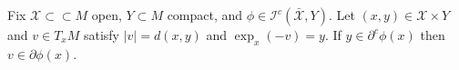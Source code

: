 \begin{lem}
	\label{lem:c-super-gradients_imply_super-gradients}
	Fix \( \mathcal { X } \subset \subset M \) open,
	\( Y \subset M \) compact, and \( \phi \in \mathcal { I } ^ { c } ( \bar { \mathcal{X} } , Y ) \).
	Let \( ( x , y ) \in \mathcal { X } \times Y \) and \( v \in T _ { x } M \) satisfy
	\( | v | = d ( x , y ) \) and \( \exp _ { x } ( - v ) = y\).
	If \( y \in \partial ^ { c } \phi ( x ) \) then
	\( v \in \partial \phi ( x ) \).
\end{lem}

